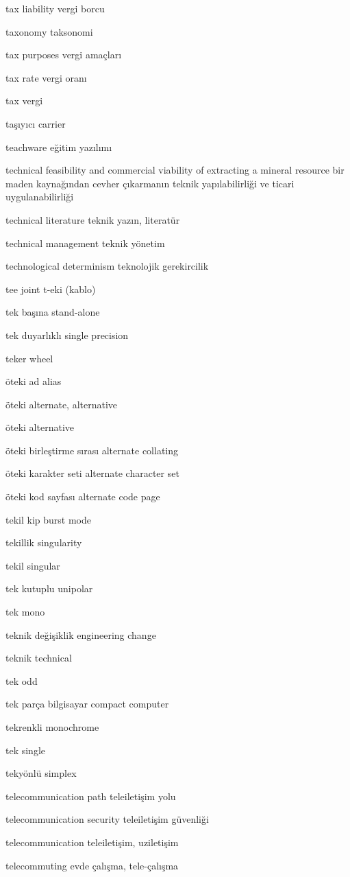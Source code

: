 \documentclass[12pt,fleqn]{article}\usepackage{../../common}
\begin{document}
tax liability vergi borcu

taxonomy taksonomi

tax purposes vergi amaçları

tax rate vergi oranı

tax vergi

taşıyıcı carrier

teachware eğitim yazılımı

technical feasibility and commercial viability of extracting a mineral resource bir maden kaynağından cevher çıkarmanın teknik yapılabilirliği ve ticari uygulanabilirliği

technical literature teknik yazın, literatür

technical management teknik yönetim

technological determinism teknolojik gerekircilik

tee joint t-eki (kablo)

tek başına stand-alone

tek duyarlıklı single precision

teker wheel

öteki ad alias

öteki alternate, alternative

öteki alternative

öteki birleştirme sırası alternate collating

öteki karakter seti alternate character set

öteki kod sayfası alternate code page

tekil kip burst mode

tekillik singularity

tekil singular

tek kutuplu unipolar

tek mono

teknik değişiklik engineering change

teknik technical

tek odd

tek parça bilgisayar compact computer

tekrenkli monochrome

tek single

tekyönlü simplex

telecommunication path teleiletişim yolu

telecommunication security teleiletişim güvenliği

telecommunication teleiletişim, uziletişim

telecommuting evde çalışma, tele-çalışma
\end{document}
